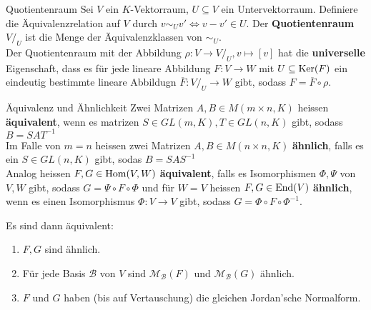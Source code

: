 \begin{definition}{Quotientenraum}
    Sei $V$ ein $K$-Vektorraum, $U \subseteq V$ ein Untervektorraum. Definiere die Äquivalenzrelation auf $V$ durch $v \sim_{U} v' \Leftrightarrow v - v' \in U$. Der \textbf{Quotientenraum} $V/_{U}$ ist die Menge der Äquivalenzklassen von $\sim_U$.\\ 
    Der Quotientenraum mit der Abbildung $\rho: V \to  V/_U, v \mapsto [v]$ hat die \textbf{universelle} Eigenschaft, dass es für jede lineare Abbildung $F: V \to W$ mit $U \subseteq \operatorname{Ker}(F)$ ein eindeutig bestimmte lineare Abbildugn $\overline{F}: V/_U \to W$ gibt, sodass $F = \overline{F} \circ \rho$. 
\end{definition}


\begin{definition}{Äquivalenz und Ähnlichkeit}
Zwei Matrizen $A, B \in M(m\times n,K)$ heissen \textbf{äquivalent}, wenn es matrizen $S \in GL(m,K), T \in GL(n,K)$ gibt, sodass $B = S A T^{-1}$\\
Im Falle von $m = n$ heissen zwei Matrizen $A, B \in M(n\times n,K)$ \textbf{ähnlich}, falls es ein $S \in GL(n,K)$ gibt, sodas $B = S A S^{-1}$\\
Analog heissen $F,G \in \operatorname{Hom}(V,W)$ \textbf{äquivalent}, falls es Isomorphismen $\Phi, \Psi$ von $V,W$ gibt, sodass $G = \Psi \circ F \circ \Phi$ und für $W = V$ heissen $F,G \in \operatorname{End}(V)$ \textbf{ähnlich}, wenn es einen Isomorphismus $\Phi: V \to V$ gibt, sodass $G = \Phi \circ F \circ \Phi^{-1}$.
\end{definition}
Es sind dann äquivalent: 
\begin{enumerate}[{(}i{)}]
    \item	$F, G$ sind ähnlich.
    \item   Für jede Basis $\mathcal{B}$ von $V$ sind $\mathcal{M}_{\mathcal{B}}(F)$ und $\mathcal{M}_{\mathcal{B}}(G)$ ähnlich.
    \item   $F$ und $G$ haben (bis auf Vertauschung) die gleichen Jordan'sche Normalform.
\end{enumerate}




